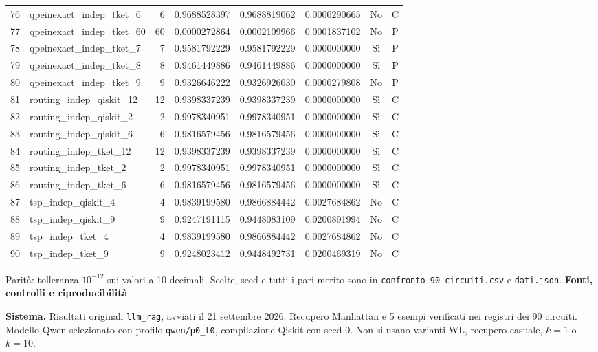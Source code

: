 \documentclass[10pt,a4paper,landscape]{article}
\newcommand{\titolo}[1]{{\Large\bfseries #1}\par\vspace{3mm}}
\begin{document}
{\begin{tabular}{rlrrrrcc}
76 & qpeinexact\_indep\_tket\_6 & 6 & 0.9688528397 & 0.9688819062 & 0.0000290665 & No & C \\
77 & qpeinexact\_indep\_tket\_60 & 60 & 0.0000272864 & 0.0002109966 & 0.0001837102 & No & P \\
78 & qpeinexact\_indep\_tket\_7 & 7 & 0.9581792229 & 0.9581792229 & 0.0000000000 & Sì & P \\
79 & qpeinexact\_indep\_tket\_8 & 8 & 0.9461449886 & 0.9461449886 & 0.0000000000 & Sì & P \\
80 & qpeinexact\_indep\_tket\_9 & 9 & 0.9326646222 & 0.9326926030 & 0.0000279808 & No & P \\
81 & routing\_indep\_qiskit\_12 & 12 & 0.9398337239 & 0.9398337239 & 0.0000000000 & Sì & C \\
82 & routing\_indep\_qiskit\_2 & 2 & 0.9978340951 & 0.9978340951 & 0.0000000000 & Sì & C \\
83 & routing\_indep\_qiskit\_6 & 6 & 0.9816579456 & 0.9816579456 & 0.0000000000 & Sì & C \\
84 & routing\_indep\_tket\_12 & 12 & 0.9398337239 & 0.9398337239 & 0.0000000000 & Sì & C \\
85 & routing\_indep\_tket\_2 & 2 & 0.9978340951 & 0.9978340951 & 0.0000000000 & Sì & C \\
86 & routing\_indep\_tket\_6 & 6 & 0.9816579456 & 0.9816579456 & 0.0000000000 & Sì & C \\
87 & tsp\_indep\_qiskit\_4 & 4 & 0.9839199580 & 0.9866884442 & 0.0027684862 & No & C \\
88 & tsp\_indep\_qiskit\_9 & 9 & 0.9247191115 & 0.9448083109 & 0.0200891994 & No & C \\
89 & tsp\_indep\_tket\_4 & 4 & 0.9839199580 & 0.9866884442 & 0.0027684862 & No & C \\
90 & tsp\_indep\_tket\_9 & 9 & 0.9248023412 & 0.9448492731 & 0.0200469319 & No & C \\
\bottomrule
\end{tabular}

}\par\small Parità: tolleranza $10^{-12}$ sui valori a 10 decimali. Scelte, seed e tutti i pari merito sono in \texttt{confronto\_90\_circuiti.csv} e \texttt{dati.json}.
\newpage
\titolo{Fonti, controlli e riproducibilità}
\textbf{Sistema.} Risultati originali \texttt{llm\_rag}, avviati il 21 settembre 2026.
Recupero Manhattan e 5 esempi verificati nei registri dei 90 circuiti.
Modello Qwen selezionato con profilo \texttt{qwen/p0\_t0}, compilazione Qiskit con seed 0.
Non si usano varianti WL, recupero casuale, $k=1$ o $k=10$.
\end{document}
